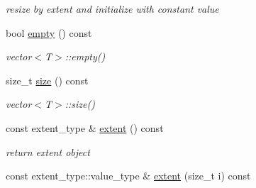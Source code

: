 \begin{DoxyCompactItemize}
\begin{DoxyCompactList}\small\item\em resize by extent and initialize with constant value \item\end{DoxyCompactList}\item 
\hypertarget{classbtas_1_1_tensor_3_01_t_00_010ul_00_01_order_01_4_a424d3370a88e19a8cb6bb2d6f729561e}{
bool \hyperlink{classbtas_1_1_tensor_3_01_t_00_010ul_00_01_order_01_4_a424d3370a88e19a8cb6bb2d6f729561e}{empty} () const }
\label{classbtas_1_1_tensor_3_01_t_00_010ul_00_01_order_01_4_a424d3370a88e19a8cb6bb2d6f729561e}

\begin{DoxyCompactList}\small\item\em vector$<$T$>$::empty() \item\end{DoxyCompactList}\item 
\hypertarget{classbtas_1_1_tensor_3_01_t_00_010ul_00_01_order_01_4_a8821b14dcf393e1ab5d9013e4acfcf5f}{
size\_\-t \hyperlink{classbtas_1_1_tensor_3_01_t_00_010ul_00_01_order_01_4_a8821b14dcf393e1ab5d9013e4acfcf5f}{size} () const }
\label{classbtas_1_1_tensor_3_01_t_00_010ul_00_01_order_01_4_a8821b14dcf393e1ab5d9013e4acfcf5f}

\begin{DoxyCompactList}\small\item\em vector$<$T$>$::size() \item\end{DoxyCompactList}\item 
\hypertarget{classbtas_1_1_tensor_3_01_t_00_010ul_00_01_order_01_4_ab867080d3a28103c8863e6f807aaa2d0}{
const extent\_\-type \& \hyperlink{classbtas_1_1_tensor_3_01_t_00_010ul_00_01_order_01_4_ab867080d3a28103c8863e6f807aaa2d0}{extent} () const }
\label{classbtas_1_1_tensor_3_01_t_00_010ul_00_01_order_01_4_ab867080d3a28103c8863e6f807aaa2d0}

\begin{DoxyCompactList}\small\item\em return extent object \item\end{DoxyCompactList}\item 
\hypertarget{classbtas_1_1_tensor_3_01_t_00_010ul_00_01_order_01_4_ae956f22afcbb89c3bb6a31c83fc4f970}{
const extent\_\-type::value\_\-type \& \hyperlink{classbtas_1_1_tensor_3_01_t_00_010ul_00_01_order_01_4_ae956f22afcbb89c3bb6a31c83fc4f970}{extent} (size\_\-t i) const }
\label{classbtas_1_1_tensor_3_01_t_00_010ul_00_01_order_01_4_ae956f22afcbb89c3bb6a31c83fc4f970}


\end{DoxyCompactItemize}
